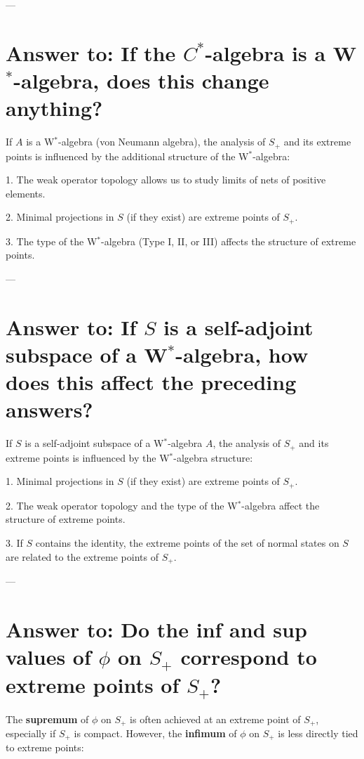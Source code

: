 \documentclass{article}
\begin{document}
---

\section*{Answer to: If the \( C^* \)-algebra is a W\(^*\)-algebra, does this change anything?}

If \( A \) is a W\(^*\)-algebra (von Neumann algebra), the analysis of \( S_+ \) and its extreme points is influenced by the additional structure of the W\(^*\)-algebra:

1. The weak operator topology allows us to study limits of nets of positive elements.

2. Minimal projections in \( S \) (if they exist) are extreme points of \( S_+ \).

3. The type of the W\(^*\)-algebra (Type I, II, or III) affects the structure of extreme points.

---

\section*{Answer to: If \( S \) is a self-adjoint subspace of a W\(^*\)-algebra, how does this affect the preceding answers?}

If \( S \) is a self-adjoint subspace of a W\(^*\)-algebra \( A \), the analysis of \( S_+ \) and its extreme points is influenced by the W\(^*\)-algebra structure:

1. Minimal projections in \( S \) (if they exist) are extreme points of \( S_+ \).

2. The weak operator topology and the type of the W\(^*\)-algebra affect the structure of extreme points.

3. If \( S \) contains the identity, the extreme points of the set of normal states on \( S \) are related to the extreme points of \( S_+ \).

---

\section*{Answer to: Do the inf and sup values of \( \phi \) on \( S_+ \) correspond to extreme points of \( S_+ \)?}

The \textbf{supremum} of \( \phi \) on \( S_+ \) is often achieved at an extreme point of \( S_+ \), especially if \( S_+ \) is compact. However, the \textbf{infimum} of \( \phi \) on \( S_+ \) is less directly tied to extreme points:
\end{document}
